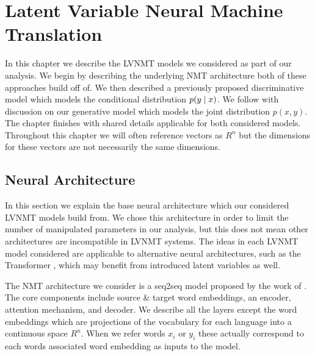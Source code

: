 \chapter{Latent Variable Neural Machine Translation}

In this chapter we describe the \ac{LVNMT} models we considered as part of our analysis. We begin by describing the underlying \ac{NMT} architecture both of these approaches build off of. We then described a previously proposed discriminative model which models the conditional distribution $p(y \; | \;{x})$. We follow with discussion on our generative model which models the joint distribution $p(x, y)$. The chapter finishes with shared details applicable for both considered models. Throughout this chapter we will often reference vectors as $R^{n}$ but the dimensions for these vectors are not necessarily the same dimensions. 


\section{Neural Architecture}

In this section we explain the base neural architecture which our considered \ac{LVNMT} models build from. We chose this architecture in order to limit the number of manipulated parameters in our analysis, but this does not mean other architectures are incompatible in \ac{LVNMT} systems. The ideas in each \ac{LVNMT} model considered are applicable to alternative neural architectures, such as the Transformer \cite{vaswani2017attentionTransformer}, which may benefit from introduced latent variables as well. 

The \ac{NMT} architecture we consider is a \ac{seq2seq} model proposed by the work of  \citet{bahdanau2014NMTBYJoint}. The core components include source \& target word embeddings, an encoder, attention mechanism, and decoder. We describe all the layers except the word embeddings which are projections of the vocabulary for each language into a continuous space $R^{n}$. When we refer  words $x_{i}$ or $y_{i}$ these actually correspond to each words associated word embedding as inputs to the model.  

